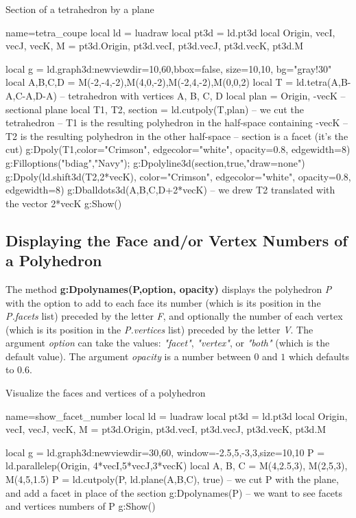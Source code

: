 \begin{demo}{Section of a tetrahedron by a plane}
\begin{luadraw}{name=tetra_coupe}
local ld = luadraw
local pt3d = ld.pt3d
local Origin, vecI, vecJ, vecK, M = pt3d.Origin, pt3d.vecI, pt3d.vecJ, pt3d.vecK, pt3d.M

local g = ld.graph3d:new{viewdir={10,60},bbox=false, size={10,10}, bg="gray!30"}
local A,B,C,D = M(-2,-4,-2),M(4,0,-2),M(-2,4,-2),M(0,0,2)
local T = ld.tetra(A,B-A,C-A,D-A) -- tetrahedron with vertices A, B, C, D
local plan = {Origin, -vecK} -- sectional plane
local T1, T2, section = ld.cutpoly(T,plan) -- we cut the tetrahedron
-- T1 is the resulting polyhedron in the half-space containing -vecK
-- T2 is the resulting polyhedron in the other half-space
-- section is a facet (it's the cut)
g:Dpoly(T1,{color="Crimson", edgecolor="white", opacity=0.8, edgewidth=8})
g:Filloptions("bdiag","Navy"); g:Dpolyline3d(section,true,"draw=none")
g:Dpoly(ld.shift3d(T2,2*vecK), {color="Crimson", edgecolor="white", opacity=0.8, edgewidth=8})
g:Dballdots3d({A,B,C,D+2*vecK}) -- we drew T2 translated with the vector 2*vecK
g:Show()
\end{luadraw}
\end{demo}

\subsection{Displaying the Face and/or Vertex Numbers of a Polyhedron}

The method \textbf{g:Dpolynames(P,option, opacity)} displays the polyhedron \emph{P} with the option to add to each face its number (which is its position in the \emph{P.facets} list) preceded by the letter \emph{F}, and optionally the number of each vertex (which is its position in the \emph{P.vertices} list) preceded by the letter \emph{V}. The argument \emph{option} can take the values: \emph{"facet"}, \emph{"vertex"}, or \emph{"both"} (which is the default value). The argument \emph{opacity} is a number between $0$ and $1$ which defaults to $0.6$.

\begin{demo}{Visualize the faces and vertices of a polyhedron}
\begin{luadraw}{name=show_facet_number}
local ld = luadraw
local pt3d = ld.pt3d
local Origin, vecI, vecJ, vecK, M = pt3d.Origin, pt3d.vecI, pt3d.vecJ, pt3d.vecK, pt3d.M

local g = ld.graph3d:new{viewdir={30,60}, window={-2.5,5,-3,3},size={10,10}}
P = ld.parallelep(Origin, 4*vecI,5*vecJ,3*vecK)
local A, B, C = M(4,2.5,3), M(2,5,3), M(4,5,1.5)
P = ld.cutpoly(P, ld.plane(A,B,C), true) -- we cut P with the plane, and add a facet in place of the section
g:Dpolynames(P) -- we want to see facets and vertices numbers of P
g:Show()
\end{luadraw}
\end{demo}

